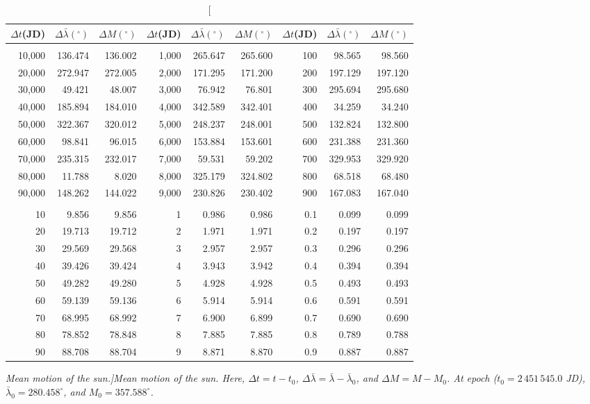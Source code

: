 \newpage
\begin{table}[h]
\centering
\begin{tabular}{rrr|rrr|rrr}
$\Delta t$(JD)& $\Delta\bar{\lambda}(^\circ)$ &  $\Delta M(^\circ)$ & $\Delta t$(JD)& $\Delta \bar{\lambda}(^\circ)$ & $\Delta M(^\circ)$ &$\Delta t$(JD)& $\Delta \bar{\lambda}(^\circ)$ & $\Delta M(^\circ)$\\ \hline
&&&&&&&&\\[-1.75ex]
10,000 & 136.474 & 136.002 & 1,000 & 265.647 & 265.600 & 100 &  98.565 &  98.560\\
20,000 & 272.947 & 272.005 & 2,000 & 171.295 & 171.200 & 200 & 197.129 & 197.120\\
30,000 &  49.421 &  48.007 & 3,000 &  76.942 &  76.801 & 300 & 295.694 & 295.680\\
40,000 & 185.894 & 184.010 & 4,000 & 342.589 & 342.401 & 400 &  34.259 &  34.240\\
50,000 & 322.367 & 320.012 & 5,000 & 248.237 & 248.001 & 500 & 132.824 & 132.800\\
60,000 &  98.841 &  96.015 & 6,000 & 153.884 & 153.601 & 600 & 231.388 & 231.360\\
70,000 & 235.315 & 232.017 & 7,000 &  59.531 &  59.202 & 700 & 329.953 & 329.920\\
80,000 &  11.788 &   8.020 & 8,000 & 325.179 & 324.802 & 800 &  68.518 &  68.480\\
90,000 & 148.262 & 144.022 & 9,000 & 230.826 & 230.402 & 900 & 167.083 & 167.040\\
&&&&&&&&\\
10 &   9.856 &   9.856 & 1 &   0.986 &   0.986 & 0.1 &   0.099 &   0.099\\
20 &  19.713 &  19.712 & 2 &   1.971 &   1.971 & 0.2 &   0.197 &   0.197\\
30 &  29.569 &  29.568 & 3 &   2.957 &   2.957 & 0.3 &   0.296 &   0.296\\
40 &  39.426 &  39.424 & 4 &   3.943 &   3.942 & 0.4 &   0.394 &   0.394\\
50 &  49.282 &  49.280 & 5 &   4.928 &   4.928 & 0.5 &   0.493 &   0.493\\
60 &  59.139 &  59.136 & 6 &   5.914 &   5.914 & 0.6 &   0.591 &   0.591\\
70 &  68.995 &  68.992 & 7 &   6.900 &   6.899 & 0.7 &   0.690 &   0.690\\
80 &  78.852 &  78.848 & 8 &   7.885 &   7.885 & 0.8 &   0.789 &   0.788\\
90 &  88.708 &  88.704 & 9 &   8.871 &   8.870 & 0.9 &   0.887 &   0.887\\
\end{tabular}
\caption[\em Mean motion of the sun.]{\em Mean motion of the sun.  Here, $\Delta t = t-t_0$, $\Delta\bar{\lambda} = \bar{\lambda}-\bar{\lambda}_0$, and $\Delta M = M - M_0$. 
At epoch  ($t_0 = 2\,451\,545.0$ JD), $\bar{\lambda}_0 = 280.458^\circ$, and $M_0 = 357.588^\circ$.}\label{lt5}
\end{table}

